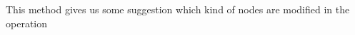 \documentclass[final]{article}
\theoremstyle{definition}
\theoremstyle{definition}
\theoremstyle{remark}
\newcommand{\includeinlinescaledsvg}[3]{\begin{minipage}{#1\textwidth}\begin{center}\end{center}\end{minipage}}
\begin{document}
\begin{longtable}{| c | c |}

\end{longtable}

This method gives us some suggestion which kind of nodes are modified in the operation
\end{document}
